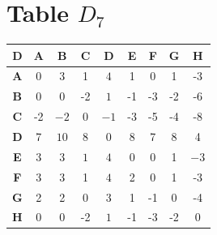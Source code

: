 \documentclass{article}
\begin{document}
\section{Table $D_{7}$}
\begin{center}
    \begin{tabular}{|c||c|c|c|c|c|c|c|c|}
        \hline
        \textbf{D} & \textbf{A} & \textbf{B} & \textbf{C} & \textbf{D} & \textbf{E} & \textbf{F} & \textbf{G} & \textbf{H} \\
        \hline
        \hline
        \textbf{A}& 0 & \cellcolor[HTML]{D74894}$3$ & 1 & \cellcolor[HTML]{D74894}$4$ & 1 & 0 & 1 & -3 \\
        \hline
        \textbf{B}& 0 & 0 & -2 & \cellcolor[HTML]{D74894}$1$ & -1 & -3 & -2 & -6 \\
        \hline
        \textbf{C}& -2 & \cellcolor[HTML]{D74894}$-2$ & 0 & \cellcolor[HTML]{D74894}$-1$ & -3 & -5 & -4 & -8 \\
        \hline
        \textbf{D}& 7 & \cellcolor[HTML]{D74894}$10$ & 8 & 0 & 8 & 7 & 8 & 4 \\
        \hline
        \textbf{E}& \cellcolor[HTML]{D74894}$3$ & \cellcolor[HTML]{D74894}$3$ & \cellcolor[HTML]{D74894}$1$ & \cellcolor[HTML]{D74894}$4$ & 0 & \cellcolor[HTML]{D74894}$0$ & 1 & \cellcolor[HTML]{D74894}$-3$ \\
        \hline
        \textbf{F}& 3 & \cellcolor[HTML]{D74894}$3$ & 1 & \cellcolor[HTML]{D74894}$4$ & 2 & 0 & 1 & -3 \\
        \hline
        \textbf{G}& 2 & 2 & 0 & 3 & 1 & -1 & 0 & -4 \\
        \hline
        \textbf{H}& 0 & \cellcolor[HTML]{D74894}$0$ & -2 & \cellcolor[HTML]{D74894}$1$ & -1 & -3 & -2 & 0 \\
        \hline
    \end{tabular}
\end{center}
\end{document}
